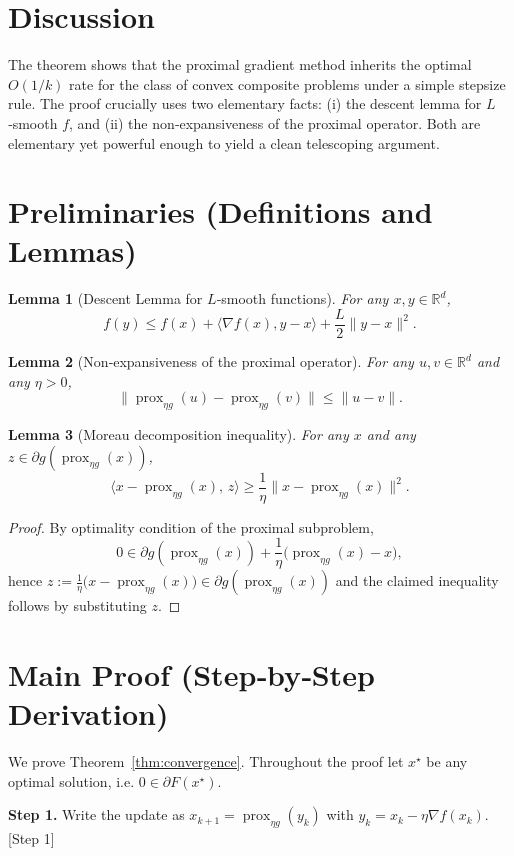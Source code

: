 \documentclass{article}
\newtheorem{lemma}{Lemma}
\newcommand{\prox}{\operatorname{prox}}
\newcommand{\R}{\mathbb{R}}
\begin{document}
\section*{Discussion}
The theorem shows that the proximal gradient method inherits the optimal $O(1/k)$ rate for the class of convex composite problems under a simple stepsize rule. The proof crucially uses two elementary facts: (i) the descent lemma for $L$‑smooth $f$, and (ii) the non‑expansiveness of the proximal operator. Both are elementary yet powerful enough to yield a clean telescoping argument.

\section*{Preliminaries (Definitions and Lemmas)}
\begin{lemma}[Descent Lemma for $L$‑smooth functions]
\label{lem:descent}
For any $x,y\in\R^{d}$,
\[
f(y)\le f(x)+\langle\nabla f(x),y-x\rangle+\frac{L}{2}\|y-x\|^{2}.
\]
\end{lemma}
\begin{lemma}[Non‑expansiveness of the proximal operator]
\label{lem:nonexp}
For any $u,v\in\R^{d}$ and any $\eta>0$,
\[
\bigl\|\prox_{\eta g}(u)-\prox_{\eta g}(v)\bigr\|\le\|u-v\|.
\]
\end{lemma}
\begin{lemma}[Moreau decomposition inequality]
\label{lem:moreau}
For any $x$ and any $z\in\partial g(\prox_{\eta g}(x))$,
\[
\langle x-\prox_{\eta g}(x),\,z\rangle\ge\frac{1}{\eta}\bigl\|x-\prox_{\eta g}(x)\bigr\|^{2}.
\]
\end{lemma}
\begin{proof}
By optimality condition of the proximal subproblem,
\[
0\in \partial g(\prox_{\eta g}(x))+\frac{1}{\eta}\bigl(\prox_{\eta g}(x)-x\bigr),
\]
hence $z:=\frac{1}{\eta}\bigl(x-\prox_{\eta g}(x)\bigr)\in\partial g(\prox_{\eta g}(x))$ and the claimed inequality follows by substituting $z$.
\end{proof}

\section*{Main Proof (Step‑by‑Step Derivation)}
We prove Theorem~\ref{thm:convergence}. Throughout the proof let $x^{\star}$ be any optimal solution, i.e. $0\in\partial F(x^{\star})$.

\noindent\textbf{Step 1.} Write the update as $x_{k+1}= \prox_{\eta g}(y_{k})$ with $y_{k}=x_{k}-\eta\nabla f(x_{k})$.\hfill[Step 1]
\end{document}
